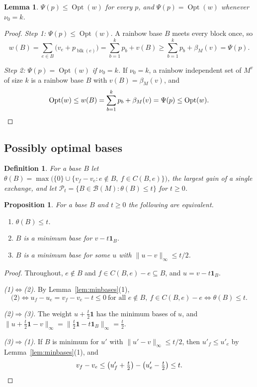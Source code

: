 \documentclass[11pt]{article}
\newtheorem{lemma}[theorem]{Lemma}
\newtheorem{proposition}[theorem]{Proposition}
\newtheorem{definition}[theorem]{Definition}
\newcommand{\Opt}{\operatorname{Opt}}
\newcommand{\blk}{\operatorname{blk}}
\newcommand{\Bases}{\mathcal B}
\newcommand{\Pos}{\mathcal P}
\begin{document}
\begin{lemma}
\label{lem:duality}
$\Psi(p)\le\Opt(w)$ for every $p$, and $\Psi(p)=\Opt(w)$ whenever $\nu_0=k$.
\end{lemma}

\begin{proof}
\emph{Step 1: $\Psi(p)\le\Opt(w)$.}  A rainbow base $B$ meets every block once, so
\[
  w(B)=\sum_{e\in B}\bigl(v_e+p_{\blk(e)}\bigr)=\sum_{b=1}^{k}p_b+v(B)
  \ge\sum_{b=1}^{k}p_b+\beta_M(v)=\Psi(p).
\]

\emph{Step 2: $\Psi(p)=\Opt(w)$ if $\nu_0=k$.}  If $\nu_0=k$, a rainbow independent set of
$M^{v}$ of size $k$ is a rainbow base $B$ with $v(B)=\beta_M(v)$, and
\[
  \Opt(w)\le w(B)=\sum_{b=1}^{k}p_b+\beta_M(v)=\Psi(p)\le\Opt(w).\qedhere
\]
\end{proof}

\subsection{Possibly optimal bases}
\label{sec:pos}

\begin{definition}
\label{def:theta}
For a base $B$ let
$\theta(B)=\max\bigl(\{0\}\cup\{v_f-v_e:e\notin B,\ f\in C(B,e)\}\bigr)$, the
largest gain of a single exchange, and let
$\Pos_t=\{B\in\Bases(M):\theta(B)\le t\}$ for $t\ge0$.
\end{definition}

\begin{proposition}
\label{prop:pos}
For a base $B$ and $t\ge0$ the following are equivalent.
\begin{enumerate}
  \item $\theta(B)\le t$.
  \item $B$ is a minimum base for $v-t\mathbf 1_B$.
  \item $B$ is a minimum base for some $u$ with $\|u-v\|_\infty\le t/2$.
\end{enumerate}
\end{proposition}

\begin{proof}
Throughout, $e\notin B$ and $f\in C(B,e)-e\subseteq B$, and $u=v-t\mathbf 1_B$.

\emph{(1)$\Leftrightarrow$(2).}  By Lemma~\ref{lem:minbases}(1),
\[
  \text{(2)}\iff u_f-u_e=v_f-v_e-t\le0\ \text{for all }e\notin B,\ f\in C(B,e)-e\iff\theta(B)\le t.
\]

\emph{(2)$\Rightarrow$(3).}  The weight $u+\tfrac t2\mathbf 1$ has the minimum
bases of $u$, and
$\|u+\tfrac t2\mathbf 1-v\|_\infty=\|\tfrac t2\mathbf 1-t\mathbf 1_B\|_\infty=\tfrac t2$.

\emph{(3)$\Rightarrow$(1).}  If $B$ is minimum for $u'$ with
$\|u'-v\|_\infty\le t/2$, then $u'_f\le u'_e$ by Lemma~\ref{lem:minbases}(1), and
\[
  v_f-v_e\le\bigl(u'_f+\tfrac t2\bigr)-\bigl(u'_e-\tfrac t2\bigr)\le t.\qedhere
\]
\end{proof}
\end{document}
